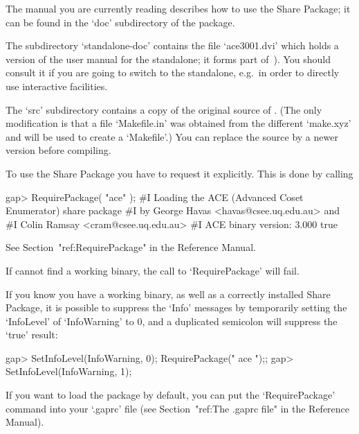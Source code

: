 The manual you are currently reading describes how to use  the  {\ACE}
Share Package; it can be  found  in  the  `doc'  subdirectory  of  the
package.

The  subdirectory  `standalone-doc'  contains the  file  `ace3001.dvi'
which holds a version of the user manual for the {\ACE} standalone; it
forms part of~\cite{Ram99}).  You  should consult it if  you are going
to  switch to  the {\ACE}  standalone, e.g.~in  order to  directly use
interactive facilities.

The  `src' subdirectory  contains a  copy  of the  original source  of
{\ACE}.  (The  only modification  is  that  a  file `Makefile.in'  was
obtained from  the different `make.xyz' and  will be used  to create a
`Makefile'.)  You  can replace  the source by  a newer  version before
compiling.


To use the {\ACE} Share Package you have  to  request  it  explicitly.
This is done by calling

\begintt
gap> RequirePackage( "ace" );
#I  Loading the ACE (Advanced Coset Enumerator) share package
#I           by George Havas <havas@csee.uq.edu.au> and
#I              Colin Ramsay <cram@csee.uq.edu.au>
#I                   ACE binary version: 3.000
true
\endtt

See Section~"ref:RequirePackage" in the {\GAP} Reference Manual.

If {\GAP} cannot find a working binary, the call  to  `RequirePackage'
will fail.

If you know you have a working {\ACE} binary, as well as  a  correctly
installed {\ACE} Share Package, it is possible to suppress the  `Info'
messages by temporarily setting the `InfoLevel' of `InfoWarning' to 0,
and a duplicated semicolon will suppress the `true' result:

\begintt
gap> SetInfoLevel(InfoWarning, 0); RequirePackage(" ace ");;
gap> SetInfoLevel(InfoWarning, 1);
\endtt

If you want to load the {\ACE} package by default, you  can  put   the
`RequirePackage' command into your `.gaprc' file (see Section~"ref:The
.gaprc file" in the {\GAP} Reference Manual).


